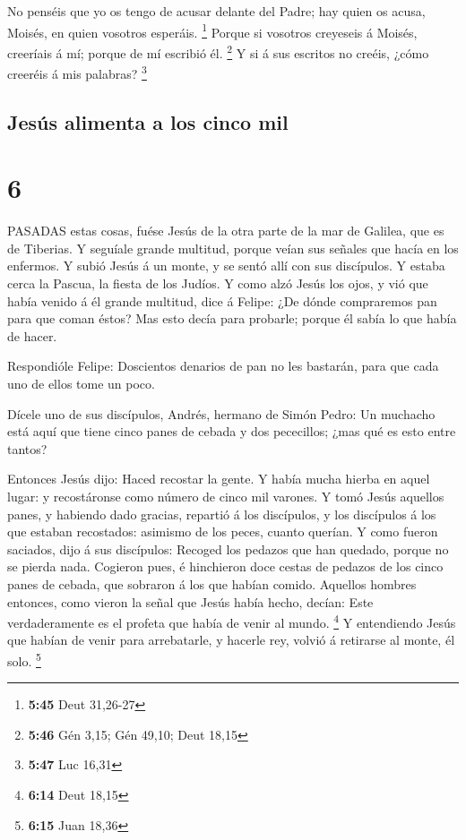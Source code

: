  No penséis que yo os tengo de acusar delante del Padre;
hay quien os acusa, Moisés, en quien vosotros esperáis. \footnote{\textbf{5:45}
  Deut 31,26-27}  Porque si vosotros creyeseis á Moisés,
creeríais á mí; porque de mí escribió él. \footnote{\textbf{5:46} Gén
  3,15; Gén 49,10; Deut 18,15}  Y si á sus escritos no
creéis, ¿cómo creeréis á mis palabras? \footnote{\textbf{5:47} Luc 16,31}

\hypertarget{jesuxfas-alimenta-a-los-cinco-mil}{%
\subsection{Jesús alimenta a los cinco
mil}\label{jesuxfas-alimenta-a-los-cinco-mil}}

\hypertarget{section-5}{%
\section{6}\label{section-5}}

 PASADAS estas cosas, fuése Jesús de la otra parte de la mar
de Galilea, que es de Tiberias.  Y seguíale grande multitud,
porque veían sus señales que hacía en los enfermos.  Y subió
Jesús á un monte, y se sentó allí con sus discípulos.  Y
estaba cerca la Pascua, la fiesta de los Judíos.  Y como
alzó Jesús los ojos, y vió que había venido á él grande multitud, dice á
Felipe: ¿De dónde compraremos pan para que coman éstos?  Mas
esto decía para probarle; porque él sabía lo que había de hacer.

 Respondióle Felipe: Doscientos denarios de pan no les
bastarán, para que cada uno de ellos tome un poco.

 Dícele uno de sus discípulos, Andrés, hermano de Simón
Pedro:  Un muchacho está aquí que tiene cinco panes de
cebada y dos pececillos; ¿mas qué es esto entre tantos?

 Entonces Jesús dijo: Haced recostar la gente. Y había
mucha hierba en aquel lugar: y recostáronse como número de cinco mil
varones.  Y tomó Jesús aquellos panes, y habiendo dado
gracias, repartió á los discípulos, y los discípulos á los que estaban
recostados: asimismo de los peces, cuanto querían.  Y como
fueron saciados, dijo á sus discípulos: Recoged los pedazos que han
quedado, porque no se pierda nada.  Cogieron pues, é
hinchieron doce cestas de pedazos de los cinco panes de cebada, que
sobraron á los que habían comido.  Aquellos hombres
entonces, como vieron la señal que Jesús había hecho, decían: Este
verdaderamente es el profeta que había de venir al mundo. \footnote{\textbf{6:14}
  Deut 18,15}  Y entendiendo Jesús que habían de venir para
arrebatarle, y hacerle rey, volvió á retirarse al monte, él solo.
\footnote{\textbf{6:15} Juan 18,36}

